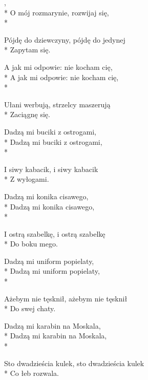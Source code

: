 \begin{lyrics}[longestline={Sto dwadzieścia kulek, sto dwadzieścia kulek}]

,\\*
O mój rozmarynie, rozwijaj się,\\*
\begin{markverses}%
Pójdę do dziewczyny, pójdę do jedynej\\*
Zapytam się.
\end{markverses}

A jak mi odpowie: nie kocham cię,\\*
A jak mi odpowie: nie kocham cię,\\*
\begin{markverses}%
Ułani werbują, strzelcy maszerują\\*
Zaciągnę się.
\end{markverses}

Dadzą mi buciki z ostrogami,\\*
Dadzą mi buciki z ostrogami,\\*
\begin{markverses}%
I siwy kabacik, i siwy kabacik\\*
Z wyłogami.
\end{markverses}

Dadzą mi konika cisawego,\\*
Dadzą mi konika cisawego,\\*
\begin{markverses}%
I ostrą szabelkę, i ostrą szabelkę\\*
Do boku mego.
\end{markverses}

Dadzą mi uniform popielaty,\\*
Dadzą mi uniform popielaty,\\*
\begin{markverses}%
Ażebym nie tęsknił, ażebym nie tęsknił\\*
Do swej chaty.
\end{markverses}

Dadzą mi karabin na Moskala,\\*
Dadzą mi karabin na Moskala,\\*
\begin{markverses}%
Sto dwadzieścia kulek, sto dwadzieścia kulek\\*
Co łeb rozwala.
\end{markverses}

\breaklyrics


\end{lyrics}
